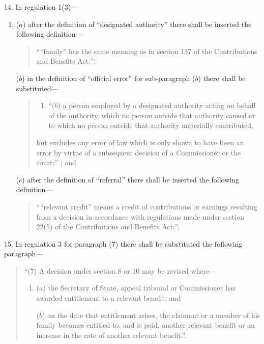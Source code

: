 \documentclass[12pt,a4paper]{article}
\begin{document}
14.  In regulation 1(3)—
\begin{enumerate}\item[]
($a$) after the definition of “designated authority” there shall be inserted the following definition—
\begin{quotation}
    ““family” has the same meaning as in section 137 of the Contributions and Benefits Act;”; 
\end{quotation}

($b$) in the definition of “official error” for sub-paragraph ($b$)  there shall be substituted—
\begin{quotation}
\begin{enumerate}\item[]
“($b$) a person employed by a designated authority acting on behalf of the authority, which no person outside that authority caused or to which no person outside that authority materially contributed,
\end{enumerate}\noindent
but excludes any error of law which is only shown to have been an error by virtue of a subsequent decision of a Commissioner or the court;” ; and
\end{quotation}

($c$) after the definition of “referral” there shall be inserted the following definition—
\begin{quotation}
““relevant credit” means a credit of contributions or earnings resulting from a decision in accordance with regulations made under section 22(5) of the Contributions and Benefits Act;”.
\end{quotation}
\end{enumerate}

\medskip

15.  In regulation 3 for paragraph (7) there shall be substituted the following paragraph—
\begin{quotation}
“(7) A decision under section 8 or 10 may be revised where—
\begin{enumerate}\item[]
($a$) the Secretary of State, appeal tribunal or Commissioner has awarded entitlement to a relevant benefit; and

($b$) on the date that entitlement arises, the claimant or a member of his family becomes entitled to, and is paid, another relevant benefit or an increase in the rate of another relevant benefit.”.
\end{enumerate}
\end{quotation}
\end{document}
